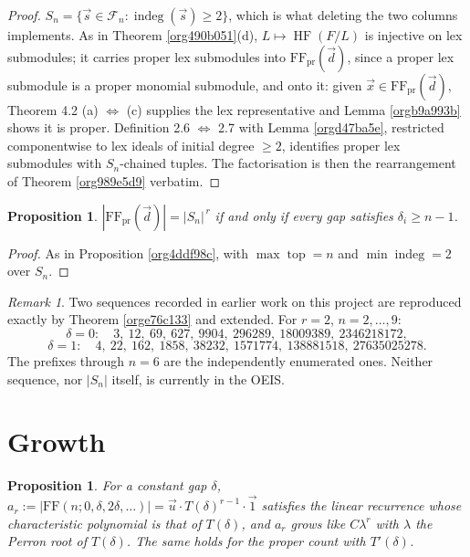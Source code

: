 \documentclass[11pt, a4paper, abstract=yes]{scrartcl}
\theoremstyle{definition}
\theoremstyle{remark}
\newtheorem{remark}[definition]{Remark}
\theoremstyle{plain}
\newtheorem{proposition}[definition]{Proposition}
\newcommand{\vek}[1]{\boldsymbol{#1}}
\newcommand{\indeg}{\operatorname{indeg}}
\newcommand{\tp}{\operatorname{top}}
\newcommand{\HF}{\operatorname{HF}}
\renewcommand{\vek}[1]{\vec{#1}}
\begin{document}
\begin{proof}
\(S_n=\lbrace \vek s\in\mathcal F_n:\indeg(\vek s)\ge2\rbrace\), which is what deleting the two columns
implements. As in Theorem \ref{org490b051}(d), \(L\mapsto\HF(F/L)\) is injective on lex submodules; it
carries proper lex submodules into \(\mathrm{FF}_{\mathrm{pr}}(\vek d)\), since a proper lex submodule is a
proper monomial submodule, and onto it: given \(\vek x\in\mathrm{FF}_{\mathrm{pr}}(\vek d)\), Theorem 4.2
(a) \(\Leftrightarrow\) (c) supplies the lex representative and Lemma \ref{orgb9a993b} shows it is
proper. Definition 2.6 \(\Leftrightarrow\) 2.7 with Lemma \ref{orgd47ba5e}, restricted componentwise
to lex ideals of initial degree \(\ge2\), identifies proper lex submodules with \(S_n\)-chained
tuples. The factorisation is then the rearrangement of Theorem \ref{org989e5d9} verbatim.
\end{proof}

\begin{proposition}
\(|\mathrm{FF}_{\mathrm{pr}}(\vek d)|=|S_n|^{\,r}\) if and only if every gap satisfies
\(\delta_i\ge n-1\).
\label{org7f42707}
\end{proposition}

\begin{proof}
As in Proposition \ref{org4ddf98c}, with \(\max\tp=n\) and \(\min\indeg=2\) over \(S_n\).
\end{proof}

\begin{remark}
Two sequences recorded in earlier work on this project are reproduced exactly by
Theorem \ref{orge76c133} and extended. For \(r=2\), \(n=2,\dots,9\):
\[
  \delta=0:\quad 3,\ 12,\ 69,\ 627,\ 9904,\ 296289,\ 18009389,\ 2346218172,
\]
\[
  \delta=1:\quad 4,\ 22,\ 162,\ 1858,\ 38232,\ 1571774,\ 138881518,\ 27635025278 .
\]
The prefixes through \(n=6\) are the independently enumerated ones. Neither sequence, nor \(|S_n|\)
itself, is currently in the OEIS.
\label{org937f09b}
\end{remark}
\section{Growth}
\label{sec:org62303f3}
\begin{proposition}
For a constant gap \(\delta\), \(a_r:=|\mathrm{FF}(n;0,\delta,2\delta,\dots)|=\vek u\cdot
T(\delta)^{r-1}\cdot\vek 1\) satisfies the linear recurrence whose characteristic polynomial is
that of \(T(\delta)\), and \(a_r\) grows like \(C\lambda^r\) with \(\lambda\) the Perron root of
\(T(\delta)\). The same holds for the proper count with \(T'(\delta)\).
\label{org30e89e0}
\end{proposition}
\end{document}
